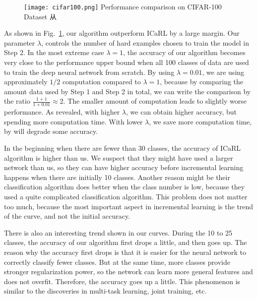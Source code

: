 \begin{figure}[!htp]
	\centering
	\texttt{[image: cifar100.png]}
	{Performance comparison on CIFAR-100 Dataset}
	\label{fig:cifar100}从
\end{figure}


As shown in Fig.~\ref{fig:cifar100}, our algorithm outperform ICaRL by a large margin. Our parameter $\lambda$, controls the number of hard examples chosen to train the model in Step 2. In the most extreme case $\lambda = 1$, the accuracy of our algorithm becomes very close to the performance upper bound when all 100 classes of data are used to train the deep neural network from scratch. By using $\lambda=0.01$, we are using approximately $1/2$ computation compared to $\lambda=1$, because by comparing the amount data used by Step 1 and Step 2 in total, we can write the comparison by the ratio $\frac{1+1}{1+0.01} \approx 2$. The smaller amount of computation leads to slightly worse performance. As revealed, with higher $\lambda$, we can obtain higher accuracy, but spending more computation time. With lower $\lambda$, we save more computation time, by will degrade some accuracy.

In the beginning when there are fewer than 30 classes, the accuracy of ICaRL algorithm is higher than us. We suspect that they might have used a larger network than us, so they can have higher accuracy before incremental learning happens when there are initially 10 classes. Another reason might be their classification algorithm does better when the class number is low, because they used a quite complicated classification algorithm. This problem does not matter too much, because the most important aspect in incremental learning is the trend of the curve, and not the initial accuracy.

There is also an interesting trend shown in our curves. During the 10 to 25 classes, the accuracy of our algorithm first drops a little, and then goes up. The reason why the accuracy first drops is that it is easier for the neural network to correctly classify fewer classes. But at the same time, more classes provide stronger regularization power, so the network can learn more general features and does not overfit. Therefore, the accuracy goes up a little. This phenomenon is similar to the discoveries in multi-task learning, joint training, etc. 

